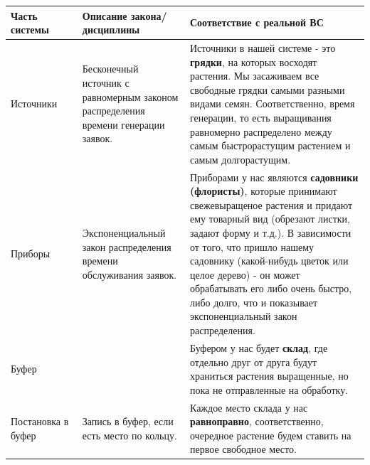 \documentclass[a4paper, 14pt]{article}
\begin{document}
\begin{center}
	\begin{tabular}{|p{0.2\linewidth} | p{0.3\linewidth}| p{0.5\linewidth}|}
		\hline
		Часть системы      & Описание закона/дисциплины                                                           & Соответствие с реальной ВС                                                                                                                                                                                                                                                                                                                                                      \\
		\hline
		Источники          & Бесконечный источник с равномерным законом распределения времени генерации заявок.   & Источники в нашей системе - это \textbf{грядки}, на которых восходят растения. Мы засаживаем все свободные грядки самыми разными видами семян. Соответственно, время генерации, то есть выращивания равномерно распределено между самым быстрорастущим растением и самым долгорастущим.                                                                                         \\
		\hline
		Приборы            & Экспоненциальный закон распределения времени обслуживания заявок.                    & Приборами у нас являются \textbf{садовники (флористы)}, которые принимают свежевыращеное растения и придают ему товарный вид (обрезают листки, задают форму и т.д.). В зависимости от того, что пришло нашему садовнику (какой-нибудь цветок или целое дерево) - он может обрабатывать его либо очень быстро, либо долго, что и показывает экспоненциальный закон распределения. \\
		\hline
		Буфер              &                                                                                      & Буфером у нас будет \textbf{склад}, где отдельно друг от друга будут храниться растения выращенные, но пока не отправленные на обработку.                                                                                                                                                                                                                                       \\
		\hline
		Постановка в буфер & Запись в буфер, если есть место по кольцу.                                           & Каждое место склада у нас \textbf{равноправно}, соответственно, очередное растение будем ставить на первое свободное место.                                                                                                                                                                                                                                                     \\

\end{tabular}
\end{center}
\end{document}
